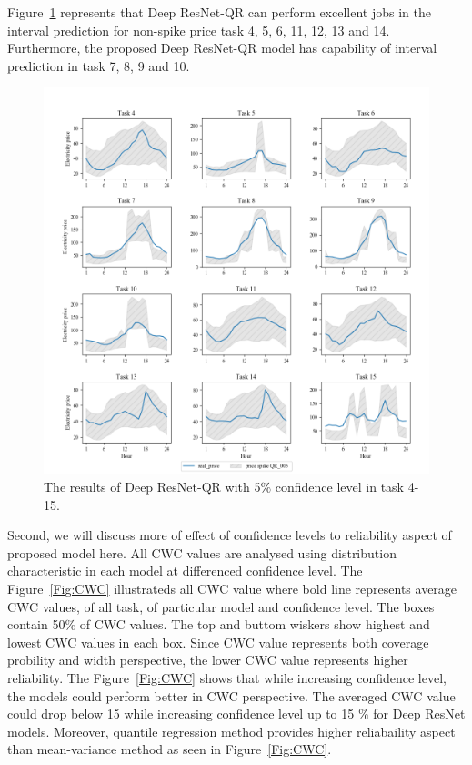 \documentclass[review]{elsarticle}
\begin{document}
    Figure~\ref{Fig:all_task_QR_005} represents that Deep ResNet-QR can perform excellent jobs in the interval prediction for non-spike price task 4, 5, 6, 11, 12, 13 and 14.
    Furthermore, the proposed Deep ResNet-QR model has capability of interval prediction in task 7, 8, 9 and 10.
    \begin{figure}[H]
      \centering
      \includegraphics[width=15cm]{All_task_with_spike_price_QR_005}
      \caption{The results of Deep ResNet-QR with 5$\%$ confidence level in task 4-15.}
      \label{Fig:all_task_QR_005}
    \end{figure}



    Second, we will discuss more of effect of confidence levels to reliability aspect of proposed model here.
    All CWC values are analysed using distribution characteristic in each model at differenced confidence level.
    The Figure~\ref{Fig:CWC} illustrateds all CWC value where bold line represents average CWC values, of all task, of particular model and confidence level.
    The boxes contain 50$\%$ of CWC values.
    The top and buttom wiskers show highest and lowest CWC values in each box.
    Since CWC value represents both coverage probility and width perspective, the lower CWC value represents higher reliability.
    The Figure~\ref{Fig:CWC} shows that while increasing confidence level, the models could perform better in CWC perspective.
    The averaged CWC value could drop below 15 while increasing confidence level up to 15 $\%$ for Deep ResNet models.
    Moreover, quantile regression method provides higher reliabaility aspect than mean-variance method as seen in Figure~\ref{Fig:CWC}.
\end{document}
